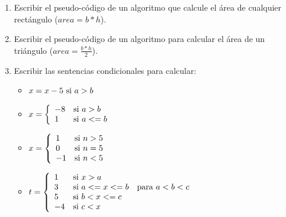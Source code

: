 \documentclass[a4paper,10pt]{article}
\begin{document}
\begin{enumerate}
\item Escribir el pseudo-c\'odigo de un algoritmo que calcule el \'area de cualquier rect\'angulo ($area = b * h$).

\item Escribir el pseudo-c\'odigo de un algoritmo para calcular el \'area de un tri\'angulo ($area = \frac{b * h}{2}$).

\item Escribir las sentencias condicionales para calcular:
	\begin{itemize}
        \item[a-]
                $
                    x =  x - 5 ~ \textrm{si} ~a > b\\
                $
        \item[b-]
                $
                    x = \left\{
                            \begin{array}{l l}
                                -8 & \textrm{si} ~a > b\\
                                1  & \textrm{si} ~a <= b\\
                            \end{array} \right.
                $
        \item[c-]
                $
                    x = \left\{
                            \begin{array}{l l}
                                1 & \textrm{si} ~n > 5\\
                                0  & \textrm{si} ~n = 5\\
                                -1  & \textrm{si} ~n < 5\\
                            \end{array} \right.
                $
        \item[d-]
                $
                    t = \left\{
                            \begin{array}{l l}
                                1 & \textrm{si} ~x > a\\
                                3 & \textrm{si} ~a <= x <= b ~~~\textrm{para}~a<b<c\\
                                5  & \textrm{si} ~b < x <= c\\
                                -4  & \textrm{si} ~c < x\\
                            \end{array} \right.
                $
    \end{itemize}


\end{enumerate}
\end{document}
